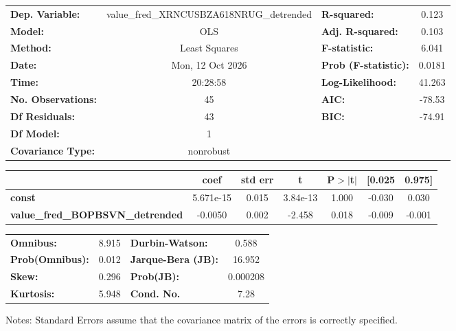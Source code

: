 \begin{center}
\begin{tabular}{lclc}
\toprule
\textbf{Dep. Variable:}                  & value\_fred\_XRNCUSBZA618NRUG\_detrended & \textbf{  R-squared:         } &     0.123   \\
\textbf{Model:}                          &                   OLS                    & \textbf{  Adj. R-squared:    } &     0.103   \\
\textbf{Method:}                         &              Least Squares               & \textbf{  F-statistic:       } &     6.041   \\
\textbf{Date:}                           &             Mon, 12 Oct 2026             & \textbf{  Prob (F-statistic):} &   0.0181    \\
\textbf{Time:}                           &                 20:28:58                 & \textbf{  Log-Likelihood:    } &    41.263   \\
\textbf{No. Observations:}               &                      45                  & \textbf{  AIC:               } &    -78.53   \\
\textbf{Df Residuals:}                   &                      43                  & \textbf{  BIC:               } &    -74.91   \\
\textbf{Df Model:}                       &                       1                  & \textbf{                     } &             \\
\textbf{Covariance Type:}                &                nonrobust                 & \textbf{                     } &             \\
\bottomrule
\end{tabular}
\begin{tabular}{lcccccc}
                                         & \textbf{coef} & \textbf{std err} & \textbf{t} & \textbf{P$> |$t$|$} & \textbf{[0.025} & \textbf{0.975]}  \\
\midrule
\textbf{const}                           &    5.671e-15  &        0.015     &  3.84e-13  &         1.000        &       -0.030    &        0.030     \\
\textbf{value\_fred\_BOPBSVN\_detrended} &      -0.0050  &        0.002     &    -2.458  &         0.018        &       -0.009    &       -0.001     \\
\bottomrule
\end{tabular}
\begin{tabular}{lclc}
\textbf{Omnibus:}       &  8.915 & \textbf{  Durbin-Watson:     } &    0.588  \\
\textbf{Prob(Omnibus):} &  0.012 & \textbf{  Jarque-Bera (JB):  } &   16.952  \\
\textbf{Skew:}          &  0.296 & \textbf{  Prob(JB):          } & 0.000208  \\
\textbf{Kurtosis:}      &  5.948 & \textbf{  Cond. No.          } &     7.28  \\
\bottomrule
\end{tabular}
\end{center}

Notes: \newline
 [1] Standard Errors assume that the covariance matrix of the errors is correctly specified.